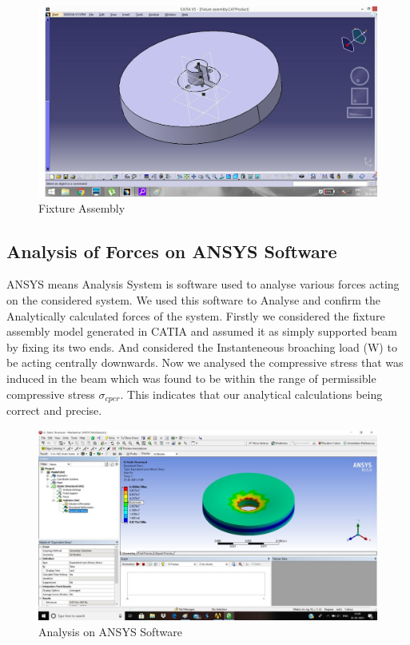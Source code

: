 \documentclass[16pt,a4paper]{article}
\begin{document}
\begin{figure}[H]
\centering
\includegraphics[scale=0.3]{Fixture Assembly}
\caption{Fixture Assembly}
\label{fig:Fixture Assembly}
\end{figure}

\subsection{Analysis of Forces on ANSYS Software}
ANSYS means Analysis System is software used to analyse various forces acting on the considered system. We used this software to Analyse and confirm the Analytically calculated forces of the system. Firstly we considered the fixture assembly model generated in CATIA and assumed it as simply supported beam by fixing its two ends. And considered the Instanteneous broaching load (W) to be acting centrally downwards. Now we analysed the compressive stress that was induced in the beam which was found to be within the range of permissible compressive stress $\sigma_{cper}$. This indicates that our analytical calculations being correct and precise.

\begin{figure}[H]
\centering
\includegraphics[scale=0.3]{Analysis on ANSYS Software}
\caption{Analysis on ANSYS Software}
\label{fig:Analysis on ANSYS Software}
\end{figure}
\end{document}
